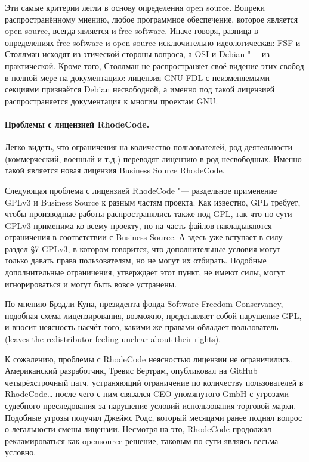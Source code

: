 \documentclass[10pt, a5paper]{article}
\begin{document}
Эти самые критерии легли в основу определения open source. Вопреки распространённому мнению, любое программное обеспечение, которое является open source, всегда является и free software. Иначе говоря, разница в определениях free software и open source исключительно идеологическая: FSF и Столлман исходят из этической стороны вопроса, а OSI и Debian "--- из практической. Кроме того, Столлман не распространяет своё видение этих свобод в полной мере на документацию: лицензия GNU FDL с неизменяемыми секциями признаётся Debian несвободной, а именно под такой лицензией распространяется документация к многим проектам GNU.

\paragraph{Проблемы с лицензией RhodeCode.}

Легко видеть, что ограничения на количество пользователей, род деятельности (коммерческий, военный и т.д.) переводят лицензию в род несвободных. Именно такой является новая лицензия Business Source RhodeCode.

Следующая проблема с лицензией RhodeCode "--- раздельное применение GPLv3 и Business Source к разным частям проекта. Как известно, GPL требует, чтобы производные работы распространялись также под GPL, так что по сути GPLv3 применима ко всему проекту, но на часть файлов накладываются ограничения в соответствии с Business Source. А здесь уже вступает в силу раздел §7 GPLv3, в котором говорится, что дополнительные условия могут только давать права пользователям, но не могут их отбирать. Подобные дополнительные ограничения, утверждает этот пункт, не имеют силы, могут игнорироваться и могут быть вовсе устранены.

По мнению Брэдли Куна, президента фонда Software Freedom Conservancy, подобная схема лицензирования, возможно, представляет собой нарушение GPL, и вносит неясность насчёт того, какими же правами обладает пользователь (leaves the redistributor feeling unclear about their rights).

К сожалению, проблемы с RhodeCode неясностью лицензии не ограничились. Американский разработчик, Тревис Бертрам, опубликовал на GitHub четырёхстрочный патч, устраняющий ограничение по количеству пользователей в RhodeCode\ldots{} после чего с ним связался CEO упомянутого GmbH с угрозами судебного преследования за нарушение условий использования торговой марки. Подобные угрозы получил Джеймс Родс, который месяцами ранее поднял вопрос о легальности смены лицензии. Несмотря на это, RhodeCode продолжал рекламироваться как opensource-решение, таковым по сути являясь весьма условно.
\end{document}
